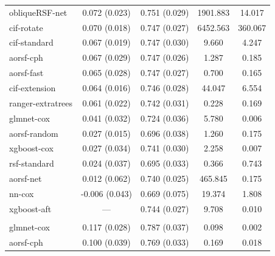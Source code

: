 \documentclass{article}\usepackage[]{graphicx}\usepackage[]{xcolor}
\newenvironment{knitrout}{}{} %
\begin{document}
\begin{knitrout}
\begin{longtable}[t]{lcccc}
\hline
\hspace{1em}obliqueRSF-net & 0.072 (0.023) & 0.751 (0.029) & 1901.883 & 14.017\\
\hspace{1em}cif-rotate & 0.070 (0.018) & 0.747 (0.027) & 6452.563 & 360.067\\
\hspace{1em}cif-standard & 0.067 (0.019) & 0.747 (0.030) & 9.660 & 4.247\\
\hspace{1em}aorsf-cph & 0.067 (0.029) & 0.747 (0.026) & 1.287 & 0.185\\
\hspace{1em}aorsf-fast & 0.065 (0.028) & 0.747 (0.027) & 0.700 & 0.165\\
\hspace{1em}cif-extension & 0.064 (0.016) & 0.746 (0.028) & 44.047 & 6.554\\
\hspace{1em}ranger-extratrees & 0.061 (0.022) & 0.742 (0.031) & 0.228 & 0.169\\
\hspace{1em}glmnet-cox & 0.041 (0.032) & 0.724 (0.036) & 5.780 & 0.006\\
\hspace{1em}aorsf-random & 0.027 (0.015) & 0.696 (0.038) & 1.260 & 0.175\\
\hspace{1em}xgboost-cox & 0.027 (0.034) & 0.741 (0.030) & 2.258 & 0.007\\
\hspace{1em}rsf-standard & 0.024 (0.037) & 0.695 (0.033) & 0.366 & 0.743\\
\hspace{1em}aorsf-net & 0.012 (0.062) & 0.740 (0.025) & 465.845 & 0.175\\
\hspace{1em}nn-cox & -0.006 (0.043) & 0.669 (0.075) & 19.374 & 1.808\\
\hspace{1em}xgboost-aft & --- & 0.744 (0.027) & 9.708 & 0.010\\
\addlinespace[0.3em]
\multicolumn{5}{l}{\textit{\textbf{FCL; death, n = 541, p = 7}}}\\
\hline
\hspace{1em}glmnet-cox & 0.117 (0.028) & 0.787 (0.037) & 0.098 & 0.002\\
\hspace{1em}aorsf-cph & 0.100 (0.039) & 0.769 (0.033) & 0.169 & 0.018\\

\end{longtable}
\end{knitrout}
\end{document}
